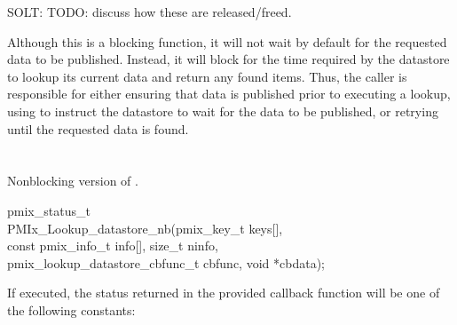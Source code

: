 SOLT: TODO: discuss how these are released/freed.

\adviceuserstart
Although this is a blocking function, it will not wait by default for the requested data to be published.
Instead, it will block for the time required by the datastore to lookup its current data and return any found items.
Thus, the caller is responsible for either ensuring that data is published prior to executing a lookup, using  to instruct the datastore to wait for the data to be published, or retrying until the requested data is found.
\adviceuserend


\section{}

\summary

Nonblocking version of .

\format

\cspecificstart
\begin{codepar}
pmix_status_t \\
PMIx_Lookup_datastore_nb(pmix_key_t keys[], \\
\hspace*{15\sigspace}const pmix_info_t info[], size_t ninfo, \\
\hspace*{15\sigspace}pmix_lookup_datastore_cbfunc_t cbfunc, void *cbdata);
\end{codepar}
\cspecificend

\begin{arglist}
\end{arglist}

\returnsimplenb

If executed, the status returned in the provided callback function will be one of the following constants:

